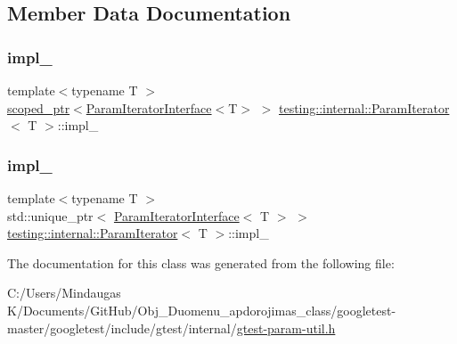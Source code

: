 \subsection{Member Data Documentation}
\mbox{\label{classtesting_1_1internal_1_1_param_iterator_ad135238185ed6bf4fb1cfafc2d3d1875}} 
\subsubsection{\texorpdfstring{impl\_}{impl\_}\hspace{0.1cm}{\footnotesize\ttfamily [1/2]}}
{\footnotesize\ttfamily template$<$typename T $>$ \\
\mbox{\hyperlink{classtesting_1_1internal_1_1scoped__ptr}{scoped\+\_\+ptr}}$<$\mbox{\hyperlink{classtesting_1_1internal_1_1_param_iterator_interface}{Param\+Iterator\+Interface}}$<$T$>$ $>$ \mbox{\hyperlink{classtesting_1_1internal_1_1_param_iterator}{testing\+::internal\+::\+Param\+Iterator}}$<$ T $>$\+::impl\+\_\+\hspace{0.3cm}{\ttfamily [private]}}

\mbox{\label{classtesting_1_1internal_1_1_param_iterator_aa38fe424573224620673876190e37b24}} 
\subsubsection{\texorpdfstring{impl\_}{impl\_}\hspace{0.1cm}{\footnotesize\ttfamily [2/2]}}
{\footnotesize\ttfamily template$<$typename T $>$ \\
std\+::unique\+\_\+ptr$<$ \mbox{\hyperlink{classtesting_1_1internal_1_1_param_iterator_interface}{Param\+Iterator\+Interface}}$<$ T $>$ $>$ \mbox{\hyperlink{classtesting_1_1internal_1_1_param_iterator}{testing\+::internal\+::\+Param\+Iterator}}$<$ T $>$\+::impl\+\_\+\hspace{0.3cm}{\ttfamily [private]}}



The documentation for this class was generated from the following file\+:\begin{DoxyCompactItemize}
\item 
C\+:/\+Users/\+Mindaugas K/\+Documents/\+Git\+Hub/\+Obj\+\_\+\+Duomenu\+\_\+apdorojimas\+\_\+class/googletest-\/master/googletest/include/gtest/internal/\mbox{\hyperlink{googletest-master_2googletest_2include_2gtest_2internal_2gtest-param-util_8h}{gtest-\/param-\/util.\+h}}\end{DoxyCompactItemize}
